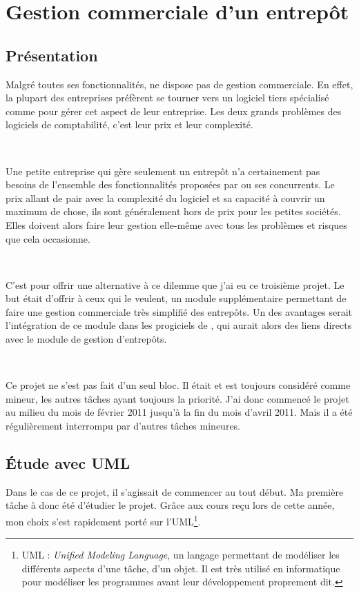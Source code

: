 \chapter{Gestion commerciale d'un entrepôt}
\label{gestion_commerciale}

\section{Présentation}
Malgré toutes ses fonctionnalités, \integrale{} ne dispose pas de gestion commerciale. En effet, la plupart des entreprises préfèrent se tourner vers un logiciel  tiers spécialisé comme  pour gérer cet aspect de leur entreprise. Les deux grands problèmes des logiciels de comptabilité, c'est leur prix et leur complexité.

~

Une petite entreprise qui gère seulement un entrepôt n'a certainement pas besoins de l'ensemble des fonctionnalités proposées par  ou ses concurrents. Le prix allant de pair avec la complexité du logiciel et sa capacité à couvrir un maximum de chose, ils sont généralement hors de prix pour les petites sociétés. Elles doivent alors faire leur gestion elle-même avec tous les problèmes et risques que cela occasionne.

~

C'est pour offrir une alternative à ce dilemme que j'ai eu ce troisième projet. Le but était d'offrir à ceux qui le veulent, un module supplémentaire permettant de faire une gestion commerciale très simplifié des entrepôts. Un des avantages serait l'intégration de ce module dans les progiciels de \solulog, qui aurait alors des liens directs avec le module de gestion d'entrepôts.

~

Ce projet ne s'est pas fait d'un seul bloc. Il était et est toujours considéré comme mineur, les autres tâches ayant toujours la priorité. J'ai donc commencé le projet au milieu du mois de février 2011 jusqu'à la fin du mois d'avril 2011. Mais il a été régulièrement interrompu par d'autres tâches mineures.

\section{Étude avec UML}
Dans le cas de ce projet, il s'agissait de commencer au tout début. Ma première tâche à donc été d'étudier le projet. Grâce aux cours reçu lors de cette année, mon choix s'est rapidement porté sur l'UML\footnote{UML : \emph{Unified Modeling Language}, un \og langage \fg{} permettant de modéliser les différents aspects d'une tâche, d'un objet. Il est très utilisé en informatique pour modéliser les programmes avant leur développement proprement dit.}.

